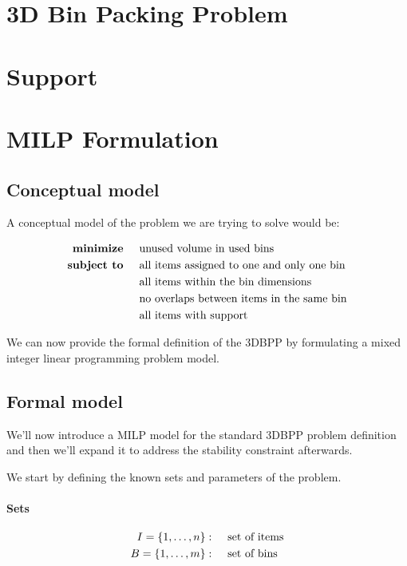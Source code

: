\section{3D Bin Packing Problem}

\section{Support} %

\section{MILP Formulation}
\label{sec:milp}%
\subsection*{Conceptual model}
A conceptual model of the problem we are trying to solve would be:

\begin{align*}
    \textbf{minimize} \hspace{.5cm}   & \text{unused volume in used bins} \\
    \textbf{subject to} \hspace{.5cm} & \text{all items assigned to one and only one bin} \\
                                      & \text{all items within the bin dimensions} \\
                                      & \text{no overlaps between items in the same bin} \\
                                      & \text{all items with support} \\
\end{align*}

We can now provide the formal definition of the 3DBPP by formulating a mixed integer linear programming problem model.

\subsection*{Formal model}
\label{ssec:formal_model}
We'll now introduce a MILP model for the standard 3DBPP problem definition and then we'll expand it to address the stability constraint afterwards.

We start by defining the known sets and parameters of the problem.
\paragraph*{Sets}
\begin{align*}
    I = \{1,\dots, n \}: \hspace{.5cm}& \text{set of items} \\
    B = \{1,\dots, m \}: \hspace{.5cm}& \text{set of bins} 
\end{align*}
